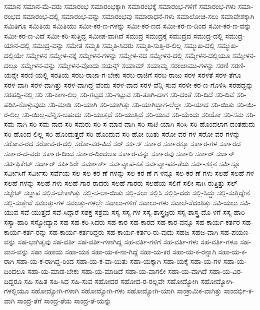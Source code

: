 {ಸಮಾನ
ಸಮಾನ-ಮೆ-ವರು
ಸಮಾರಂಭ
ಸಮಾರಂಭಕ್ಕಾಗಿ
ಸಮಾರಂಭಕ್ಕೆ
ಸಮಾರಂಭ-ಗಳಿಗೆ
ಸಮಾರಂಭ-ಗಳು
ಸಮಾ-ರಂಭದ
ಸಮಾರಂಭ-ದಲ್ಲಿ
ಸಮಾರಂಭ-ವನ್ನು
ಸಮಾರಂಭವು
ಸಮಾರಾಧನೆ-ಗಳು
ಸಮಾಲೋಚಿ-ಸಲು
ಸಮಾವೇಶಕ್ಕಾಗಿ
ಸಮಿತಿಗೂ
ಸಮಿತಿಯ
ಸಮಿತಿಯು
ಸಮೀ-ಕರ-ಣ-ಗಳನ್ನು
ಸಮೀ-ಕರ-ಣದ
ಸಮೀ-ಕರ-ಣ-ದಿಂದ
ಸಮೀ-ಕರ-ಣ-ವನ್ನು
ಸಮೀ-ಕರ-ಣ-ವಿದೆ
ಸಮೀ-ಕರಿ-ಸುತ್ತಿದ್ದ
ಸಮೀಪ-ವಾಗಿದೆ
ಸಮುದ್ರ
ಸಮುದ್ರಕ್ಕೆ
ಸಮುದ್ರದ
ಸಮುದ್ರ-ದಲ್ಲಿ
ಸಮುದ್ರ-ಯಾನ-ದಲ್ಲಿ
ಸಮುದ್ರ-ವನ್ನು
ಸಮೇತ
ಸಮ್ಮತಿ
ಸಮ್ಮತಿ-ಸಿದರು
ಸಮ್ಮತಿ-ಸುತ್ತಿ-ರ-ಲಿಲ್ಲ
ಸಮ್ಮುಖ-ದಲ್ಲಿ
ಸಮ್ಮುಖ-ದಲ್ಲಿಯೇ
ಸಮ್ಮೇಳನ
ಸಮ್ಮೇಳ-ನಕ್ಕೆ
ಸಮ್ಮೇಳನ-ಗಳನ್ನು
ಸಮ್ಮೇಳ-ನದ
ಸಮ್ಮೇಳನ-ದಲ್ಲಿ
ಸಮ್ಮೇಳನ-ದಲ್ಲಿಯೂ
ಸಮ್ಮೇಳನ-ದಲ್ಲೂ
ಸಮ್ಮೇಳನ-ವನ್ನು
ಸಮ್ಮೇಳನ-ವೊಂದು
ಸಯನ್ಸ್
ಸಯಾಮ್
ಸಯಾಮ್ನ
ಸರಂಜಾಮು-ಗಳನ್ನು
ಸರಣಿ
ಸರಣಿ-ಯನ್ನೇ
ಸರಣಿ-ಯಲ್ಲಿ
ಸರತಿಯ
ಸರಬ-ರಾಜಾ-ಗ-ಬೇಕು
ಸರಬ-ರಾಜಿಗೆ
ಸರಬ-ರಾಜು
ಸರಳ
ಸರಳತೆ
ಸರಳ-ತೆಗೂ
ಸರಳ-ವಾಗಿ
ಸರಳ-ವಾಗಿತ್ತು
ಸರಳ-ವಾಗಿದ್ದ-ವೆಂದು
ಸರಳ-ವಾದ
ಸರಳ-ವೆನ್ನಿ-ಸುವ
ಸರಳೀ-ಕರ-ಣ-ಗೊಳಿಸಿ
ಸರಹದ್ದನ್ನು
ಸರಹದ್ದಿ-ನಲ್ಲಿ
ಸರಿ
ಸರಿ-ಕಾಣ-ಲಿಲ್ಲ
ಸರಿ-ಗಟ್ಟದ
ಸರಿ-ಗಟ್ಟುವ
ಸರಿ-ತೂಗಿ-ದಾಗ
ಸರಿ-ದಂತೆ
ಸರಿ-ದಿದೆ
ಸರಿ-ದಿವೆ
ಸರಿ-ಪಡಿಸಿ-ಕೊಳ್ಳುವುದು
ಸರಿ-ಮಾಡಿ
ಸರಿ-ಯಾಗಿ
ಸರಿ-ಯಾಗಿತ್ತು
ಸರಿ-ಯಾಗಿದ್ದಾಗ-ಲೆಲ್ಲಾ
ಸರಿ-ಯಾದ
ಸರಿ-ಯಿತು
ಸರಿ-ಯಿ-ರ-ಲಿಲ್ಲ
ಸರಿ-ಯಿಲ್ಲ-ವೆನ್ನಿಸ-ಬಹುದು
ಸರಿ-ಯುತ್ತದೆ
ಸರಿ-ಯುತ್ತಿದೆ
ಸರಿ-ಯುವ
ಸರಿ-ಯೆಂದು
ಸರಿಯೋ
ಸರಿ-ಸಮ
ಸರಿ-ಸಮ-ನಾಗಿ
ಸರಿ-ಸಮ-ನಾದ
ಸರಿ-ಸಮರು
ಸರಿ-ಸ-ಮಾನ-ವಾಗಿ
ಸರಿ-ಸಾಟಿ-ಯಾಗಿ
ಸರಿಸಿ
ಸರಿ-ಹೊಂದಲಾಗ-ದಂತಹುದು
ಸರಿ-ಹೊಂದ-ಲಿಲ್ಲ
ಸರಿ-ಹೊಂದುತ್ತದೆ
ಸರಿ-ಹೊಂದುವ
ಸರಿ-ಹೋ-ಯಿತು
ಸರೋ-ವರ-ಗಳ
ಸರೋ-ವರ-ಗಳನ್ನು
ಸರೋವ-ರದ
ಸರೋವ-ರ-ದಲ್ಲಿ
ಸರೋ-ವರ-ವಿದೆ
ಸರ್
ಸರ್ಕಸ್
ಸರ್ಕಾರ
ಸರ್ಕಾರಕ್ಕೂ
ಸರ್ಕಾರ-ಗಳ
ಸರ್ಕಾರದ
ಸರ್ಕಾರ-ದ-ವರು
ಸರ್ಕಾರ-ದಿಂದ
ಸರ್ಕಾರ-ದಿಂದಲೂ
ಸರ್ಕಾರ-ವನ್ನು
ಸರ್ಕಾರವು
ಸರ್ಕಾರಿ
ಸರ್ಕಾರ್
ಸರ್ಜನ್
ಸರ್ಟಿಫಿಕೇಟ್
ಸರ್ದಾರ್
ಸರ್ಪಿಸಿರೇ
ಸರ್ಮಾರ್ಕ್
ಸರ್ವವ್ಯಾಪ-ಕತೆ
ಸರ್ವವ್ಯಾ-ಪಕ-ತೆಯ
ಸರ್ವ-ಶಕ್ತನ
ಸರ್ವಿಸ್ಗೂ
ಸರ್ವೀಸಿಗೆ
ಸರ್ವೀಸು
ಸರ್ವೆಯ
ಸಲ
ಸಲ-ಕರ-ಣೆ-ಗಳನ್ನು
ಸಲ-ಕರ-ಣೆ-ಗ-ಳನ್ನೂ
ಸಲ-ಕರ-ಣೆ-ಗಳು
ಸಲಹೆ
ಸಲಹೆ-ಗಳ
ಸಲಹೆ-ಗಳನ್ನು
ಸಲಹೆ-ಗಳು
ಸಲಹೆ-ಗಾರ-ರಾದರು
ಸಲಹೆ-ಗಾರರು
ಸಲಹೆಯ
ಸಲಿಗೆ
ಸಲೀ-ಸಾಗಿ-ರುತ್ತಿತ್ತು
ಸಲ್
ಸಲ್ಫೇಟ್
ಸಲ್ಲಾಪ
ಸಲ್ಲಿಸ-ಬೇಕಾಗಿತ್ತು
ಸಲ್ಲಿ-ಸ-ಲಾ-ಯಿತು
ಸಲ್ಲಿ-ಸಲು
ಸಲ್ಲಿಸಿ
ಸಲ್ಲಿಸಿ-ದರು
ಸಲ್ಲಿ-ಸಿದ್ದು
ಸಲ್ಲಿ-ಸುತ್ತಿದ್ದೇನೆ
ಸಲ್ಲಿ-ಸುತ್ತೇವೆ
ಸವಲತ್ತು-ಗಳ
ಸವಲತ್ತು-ಗಳಲ್ಲೇ
ಸವಾಲು-ಗಳಿಗೆ
ಸವಾಲು-ಗಳು
ಸವಾಲೆ-ಸೆದಂತಿತ್ತು
ಸವಿ-ಯಲು
ಸವಿ-ಯುವ
ಸವೆ-ಯುತ್ತದೆ
ಸವೆ-ಸಿದ್ದಾರೆ
ಸಶಕ್ತ
ಸಶ್ರಮ
ಸಸ್ಯ
ಸಸ್ಯ-ಗಳ
ಸಸ್ಯ-ಶಾಸ್ತ್ರಜ್ಞರು
ಸಸ್ಯ-ಶಾಸ್ತ್ರ-ದೊ-ಳಗೆ
ಸಸ್ಯ-ಹಾರಿ
ಸಸ್ಯಾ-ಹಾರಿ
ಸಸ್ಯೋದ್ಯಾನ
ಸಹ
ಸಹ-ಕರಿ-ಸಿದರು
ಸಹ-ಕಾರ
ಸಹ-ಕಾರದ
ಸಹ-ಕಾರ-ವನ್ನೂ
ಸಹ-ಕಾರ್ಯ-ಕರ್ತರ
ಸಹ-ಕಾರ್ಯ-ಕರ್ತ-ರನ್ನು
ಸಹ-ಕಾರ್ಯ-ಕರ್ತರಿದ್ದರು
ಸಹ-ಕಾರ್ಯ-ಕರ್ತರಿ-ರು-ವುದು
ಸಹಜ
ಸಹಜ-ವಾಗಿ
ಸಹ-ಪಯಣ-ವನ್ನು
ಸಹ-ಭಾಗಿತ್ವವು
ಸಹ-ವರ್ತಿ
ಸಹ-ವರ್ತಿ-ಗಳಾಗಿದ್ದ
ಸಹ-ವರ್ತಿ-ಗಳಿಗೆ
ಸಹ-ವರ್ತಿ-ಗಳು
ಸಹ-ವರ್ತಿ-ಗಳೂ
ಸಹ-ವಾಸ-ವನ್ನು
ಸಹಾ
ಸಹಾಯ
ಸಹಾ-ಯಕ
ಸಹಾ-ಯ-ಕ-ನಾ-ಗಿದ್ದೆ
ಸಹಾ-ಯ-ಕರ
ಸಹಾ-ಯ-ಕ-ರನ್ನಾಗಿ
ಸಹಾ-ಯ-ಕ-ರಾಗಿ
ಸಹಾ-ಯ-ಕ-ರಾಗಿದ್ದ-ರಿಂದ
ಸಹಾ-ಯ-ಕ-ವಾ-ಯಿತು
ಸಹಾ-ಯಕ್ಕಾಗಿ
ಸಹಾ-ಯಕ್ಕೆ
ಸಹಾ-ಯ-ಗಳ
ಸಹಾ-ಯ-ದಿಂದಲೂ
ಸಹಾ-ಯ-ಮಾಡ-ಬೇಕು
ಸಹಾ-ಯ-ಮಾಡಿದೆ
ಸಹಾ-ಯ-ವಾಗಲೀ
ಸಹಾ-ಯ-ವಾಗಿದೆ
ಸಹಾ-ಯ-ವಿರ-ದಿದ್ದರೂ
ಸಹಿ
ಸಹಿತ
ಸಹಿ-ಸಿದ
ಸಹಿ-ಸುವ
ಸಹೋದರ
ಸಹೋದ-ರ-ರಲ್ಲವೇ
ಸಹೋದ್ಯೋಗಿ
ಸಹೋದ್ಯೋಗಿ-ಗಳಲ್ಲಿಯೂ
ಸಹೋದ್ಯೋಗಿ-ಗಳಾಗಿ
ಸಹೋದ್ಯೋಗಿ-ಗಳು
ಸಹೋದ್ಯೋಗಿ-ಯಾಗಿ
ಸಾಂಕ್ರಾಮಿಕ-ವಾಗಿತ್ತು
ಸಾಂದರ್ಭಿ-ಕ-ವಾಗಿ
ಸಾಂದ್ರ-ತೆಗೆ
ಸಾಂದ್ರ-ತೆಯ
ಸಾಂದ್ರ-ತೆ-ಯನ್ನು
}
